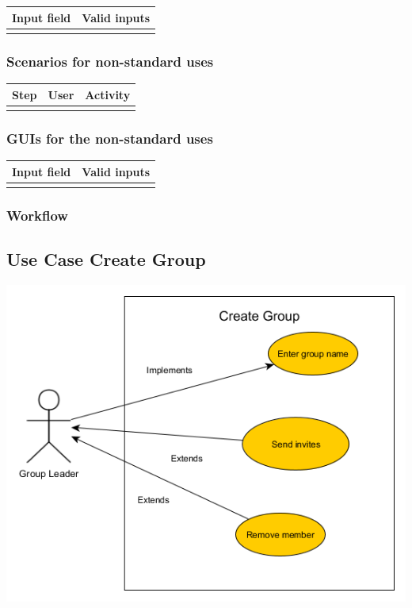 \documentclass[12pt]{article}
\theoremstyle{definition}
\begin{document}
\begin{tabular}{|l|l|}
\hline
Input field & Valid inputs \\ \hline
 &  \\ \hline
\end{tabular}

\subsubsection{Scenarios for non-standard uses}

\begin{tabular}{|l|l|l|}
\hline
Step & User & Activity \\ \hline
 & & \\ \hline
\end{tabular}

\subsubsection{GUIs for the non-standard uses}

\begin{tabular}{|l|l|}
\hline
Input field & Valid inputs \\ \hline
 &  \\ \hline
\end{tabular}

\subsubsection{Workflow}

\subsection{Use Case Create Group}

\includegraphics[scale=.5]{UseCaseCreateGroup.png}\\
\end{document}
